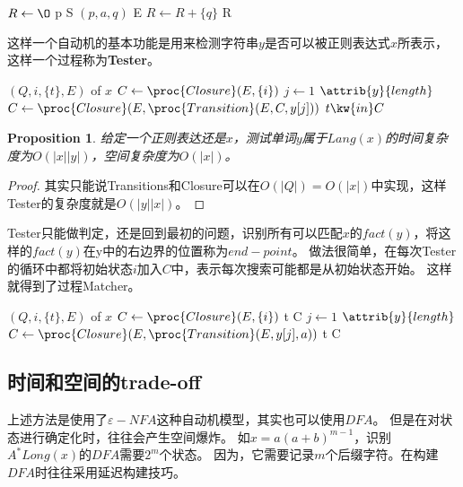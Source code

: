 \documentclass[UTF8]{ctexart}
\newtheorem{prop}[thm]{Proposition}
\theoremstyle{definition}
\theoremstyle{remark}
\numberwithin{equation}{subsection}
\newcommand{\Emph}{\textbf}
\begin{document}
	\begin{codebox}
		\li $R \gets {\O}$
		\li	\For p  S
		\li		\Do
					\For $(p,a,q)$  E
		\li				\Do
							$R \gets R + \{q\}$
						\End
				\End
		\li	\Return R
	\end{codebox}
	
	这样一个自动机的基本功能是用来检测字符串$y$是否可以被正则表达式$x$所表示，这样一个过程称为\Emph{Tester}。
	\begin{codebox}
	\Procname{$\proc{Tester}(x, y)$}
		\li	{} $(Q, i, \{t\}, E)$ of $x$
		\li $C \gets \proc{Closure}(E, \{i\})$
		\li	\For $j \gets 1$ \To $\attrib{y}{length}$
		\li		\Do
					$C \gets \proc{Closure}(E, \proc{Transition}(E, C, y[j]))$
				\End
		\li \Return $t \kw{in} C$
	\end{codebox}
	
	\begin{prop}
		给定一个正则表达还是$x$，测试单词$y$属于$Lang(x)$的时间复杂度为$O(|x||y|)$，空间复杂度为$O(|x|)$。
	\end{prop}
	
	\begin{proof}
		其实只能说Transitions和Closure可以在$O(|Q|)=O(|x|)$中实现，这样Tester的复杂度就是$O(|y||x|)$。
	\end{proof}
	
	Tester只能做判定，还是回到最初的问题，识别所有可以匹配$x$的$fact(y)$，将这样的$fact(y)$在y中的右边界的位置称为$end-point$。
	做法很简单，在每次Tester的循环中都将初始状态$i$加入$C$中，表示每次搜索可能都是从初始状态开始。
	这样就得到了过程Matcher。
	
    \begin{codebox}
        \li	{} $(Q, i, \{t\}, E)$ of $x$
        \li $C \gets \proc{Closure}(E, \{i\})$
        \li {} \If t  C
        \li	\For $j \gets 1$ \To $\attrib{y}{length}$
        \li     \Do
                    $C \gets \proc{Closure}(E, \proc{Transition}(E, y[j], a))$
        \li         {} \If t  C
                \End
    \end{codebox}
	
\subsection{时间和空间的trade-off}
	
	上述方法是使用了$\varepsilon-NFA$这种自动机模型，其实也可以使用$DFA$。
	但是在对状态进行确定化时，往往会产生空间爆炸。
	如$x = a(a+b)^{m-1}$，识别$A^*Long(x)$的$DFA$需要$2^m$个状态。
	因为，它需要记录$m$个后缀字符。在构建$DFA$时往往采用延迟构建技巧。
	
\end{document}
